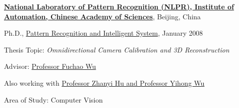 \documentclass[10pt]{article}
\begin{document}
\href{http://www.nlpr.ia.ac.cn/english/}{\textbf{ National Laboratory of Pattern Recognition (NLPR), Institute of Automation, Chinese Academy of Sciences}},
Beijing, China
\begin{outerlist}

\item[] Ph.D.,
        \href{http://www.nlpr.ia.ac.cn/english/}
             {Pattern Recognition and Intelligent System},
             January 2008
        \begin{innerlist}
        \item Thesis Topic: \emph{Omnidirectional Camera Calibration
and 3D Reconstruction}
        \item Advisor:
              \href{http://vision.ia.ac.cn/Faculty/fcwu/index.htm}
                   {Professor Fuchao Wu}
         \item Also working with \href{http://vision.ia.ac.cn/}{Professor Zhanyi Hu and Professor Yihong Wu}
        \item Area of Study: Computer Vision
        \end{innerlist}
%

\end{outerlist}
\end{document}
